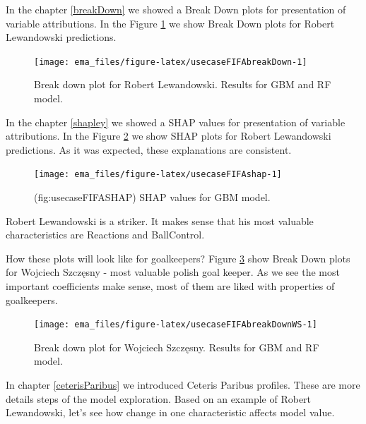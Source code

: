 \documentclass[12pt,]{krantz}
\begin{document}
In the chapter \ref{breakDown} we showed a Break Down plots for presentation of variable attributions. In the Figure \ref{fig:usecaseFIFAbreakDown} we show Break Down plots for Robert Lewandowski predictions.

\begin{figure}

{\centering \texttt{[image: ema\_files/figure-latex/usecaseFIFAbreakDown-1]} 

}

\caption{Break down plot for Robert Lewandowski. Results for GBM and RF model.}\label{fig:usecaseFIFAbreakDown}
\end{figure}

In the chapter \ref{shapley} we showed a SHAP values for presentation of variable attributions. In the Figure \ref{fig:usecaseFIFAshap} we show SHAP plots for Robert Lewandowski predictions. As it was expected, these explanations are consistent.

\begin{figure}

{\centering \texttt{[image: ema\_files/figure-latex/usecaseFIFAshap-1]} 

}

\caption{(fig:usecaseFIFASHAP) SHAP values for GBM model.}\label{fig:usecaseFIFAshap}
\end{figure}

Robert Lewandowski is a striker. It makes sense that his most valuable characteristics are Reactions and BallControl.

How these plots will look like for goalkeepers? Figure \ref{fig:usecaseFIFAbreakDownWS} show Break Down plots for Wojciech Szczęsny - most valuable polish goal keeper. As we see the most important coefficients make sense, most of them are liked with properties of goalkeepers.

\begin{figure}

{\centering \texttt{[image: ema\_files/figure-latex/usecaseFIFAbreakDownWS-1]} 

}

\caption{Break down plot for Wojciech Szczęsny. Results for GBM and RF model.}\label{fig:usecaseFIFAbreakDownWS}
\end{figure}

In chapter \ref{ceterisParibus} we introduced Ceteris Paribus profiles. These are more details steps of the model exploration. Based on an example of Robert Lewandowski, let's see how change in one characteristic affects model value.
\end{document}
